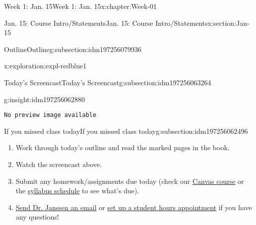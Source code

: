 \documentclass[oneside,10pt,]{book}
\newcommand{\mono}[1]{\texttt{#1}}
\numberwithin{equation}{section}
\newlength{\qrsize}
\newlength{\previewwidth}
\begin{document}
\begin{chapterptx}{Week 1: Jan. 15}{}{Week 1: Jan. 15}{}{}{x:chapter:Week-01}
\begin{sectionptx}{Jan. 15: Course Intro\slash{}Statements}{}{Jan. 15: Course Intro\slash{}Statements}{}{}{x:section:Jan-15}
\begin{subsectionptx}{Outline}{}{Outline}{}{}{g:subsection:idm197256079936}
\begin{exploration}{}{x:exploration:expl-redblue1}
\end{exploration}%
\end{subsectionptx}
%
%
\typeout{************************************************}
\typeout{************************************************}
%
\begin{subsectionptx}{Today's Screencast}{}{Today's Screencast}{}{}{g:subsection:idm197256063264}
\begin{insight}{}{g:insight:idm197256062880}%
\setlength{\qrsize}{9em}
\setlength{\previewwidth}{\linewidth}
\addtolength{\previewwidth}{-\qrsize}
\begin{tcbraster}[raster columns=2, raster column skip=1pt, raster halign=center, raster force size=false, raster left skip=0pt, raster right skip=0pt]%
\begin{tcolorbox}[previewstyle, width=\previewwidth]%
\mono{No preview image available}%
\end{tcolorbox}%
\begin{tcolorbox}[qrstyle]%
[QR LINK]\end{tcolorbox}%
\end{tcbraster}%
\end{insight}
\end{subsectionptx}
%
%
\typeout{************************************************}
\typeout{************************************************}
%
\begin{subsectionptx}{If you missed class today}{}{If you missed class today}{}{}{g:subsection:idm197256062496}
%
\begin{enumerate}
\item{}Work through today's outline and read the marked pages in the book.%
\item{}Watch the screencast above.%
\item{}Submit any homework\slash{}assignments due today (check our \href{https://dordt.instructure.com/courses/3110050}{Canvas course} or the \href{https://prof.mkjanssen.org/ds/index.html\#schedule}{syllabus schedule} to see what's due).%
\item{}\href{mailto:mike.janssen@dordt.edu}{Send Dr. Janssen an email} or \href{https://calendly.com/mkjanssen/student-hours}{set up a student hours appointment} if you have any questions!%
\end{enumerate}
\end{subsectionptx}
\end{sectionptx}
\end{chapterptx}
\end{document}
